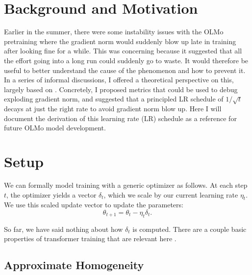 \documentclass{article}
\begin{document}
\section{Background and Motivation}

Earlier in the summer, there were some instability issues with the OLMo pretraining where the gradient norm would suddenly blow up late in training after looking fine for a while. This was concerning because it suggested that all the effort going into a long run could suddenly go to waste. It would therefore be useful to better understand the cause of the phenomenon and how to prevent it. In a series of informal discussions, I offered a theoretical perspective on this, largely based on \citet{merrill2021effects}. Concretely, I proposed metrics that could be used to debug exploding gradient norm, and suggested that a principled LR schedule of $1/\sqrt{t}$ decays at just the right rate to avoid gradient norm blow up. Here I will document the derivation of this learning rate (LR) schedule as a reference for future OLMo model development.

\section{Setup}

We can formally model training with a generic optimizer as follows. At each step $t$, the optimizer yields a vector $\delta_t$, which we scale by our current learning rate $\eta_t$. We use this scaled update vector to update the parameters:
\begin{equation*}
    \theta_{t+1} = \theta_t - \eta_t \delta_t .
\end{equation*}

So far, we have said nothing about how $\delta_t$ is computed. There are a couple basic properties of transformer training that are relevant here \citep{merrill2021effects}.

\subsection{Approximate Homogeneity}
\end{document}
